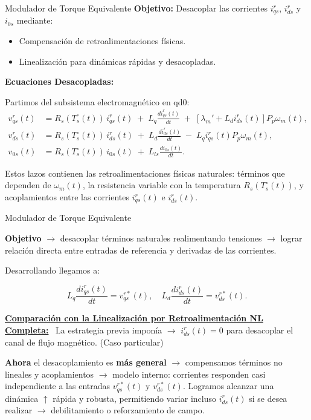 \documentclass[12pt]{beamer}
\begin{document}
\begin{frame}{Modulador de Torque Equivalente} \footnotesize
\textbf{Objetivo:} Desacoplar las corrientes \( i_{qs}^r \), \( i_{ds}^r \) y \( i_{0s} \) mediante:
\begin{itemize}
    \item Compensación de retroalimentaciones físicas.
    \item Linealización para dinámicas rápidas y desacopladas.
\end{itemize}

\textbf{Ecuaciones Desacopladas:} 

Partimos del subsistema electromagnético en qd0:
\begin{equation}
\begin{aligned}
    v_{qs}^r(t) &= R_s(T_s^\circ(t))\,i_{qs}^r(t) \;+\; L_q \frac{d i_{qs}^r(t)}{dt} \;+\; [\lambda_m' + L_d i_{ds}^r(t)] P_p \omega_m(t),\\[6pt]
    v_{ds}^r(t) &= R_s(T_s^\circ(t))\,i_{ds}^r(t) \;+\; L_d \frac{d i_{ds}^r(t)}{dt} \;-\; L_q i_{qs}^r(t) P_p \omega_m(t),\\[6pt]
    v_{0s}(t) &= R_s(T_s^\circ(t))\,i_{0s}(t) \;+\; L_{ls} \frac{d i_{0s}(t)}{dt}.
\end{aligned}
\end{equation}

Estos lazos contienen las retroalimentaciones físicas naturales: 
términos que dependen de \(\omega_m(t)\), la resistencia variable con la temperatura \(R_s(T_s^\circ(t))\), y acoplamientos entre las corrientes \(i_{qs}^r(t)\) e \(i_{ds}^r(t)\).

\end{frame}

\begin{frame}{Modulador de Torque Equivalente} \small

\textbf{Objetivo} $\rightarrow$ desacoplar términos naturales realimentando tensiones $\rightarrow$ lograr relación directa entre entradas de referencia y derivadas de las corrientes.

Desarrollando llegamos a:

\[
L_q \frac{d i_{qs}^r(t)}{dt} = v_{qs}^{r*}(t), \quad
L_d \frac{d i_{ds}^r(t)}{dt} = v_{ds}^{r*}(t).
\]

\textbf{\footnotesize \underline{Comparación con la Linealización por Retroalimentación NL Completa:}} \
La estrategia previa imponía $\rightarrow$ \( i_{ds}^r(t)=0 \) para desacoplar el canal de flujo magnético. (Caso particular)\

\textbf{Ahora} el desacoplamiento es \textbf{más general} $\rightarrow$ compensamos términos no lineales y acoplamientos $\rightarrow$ modelo interno: corrientes responden casi independiente a las entradas \( v_{qs}^{r*}(t) \) y \( v_{ds}^{r*}(t) \).
Logramos alcanzar una dinámica $\uparrow$ rápida y robusta, permitiendo variar incluso \( i_{ds}^r(t) \) si se desea realizar $\rightarrow$ debilitamiento o reforzamiento de campo.
\end{frame}
\end{document}
